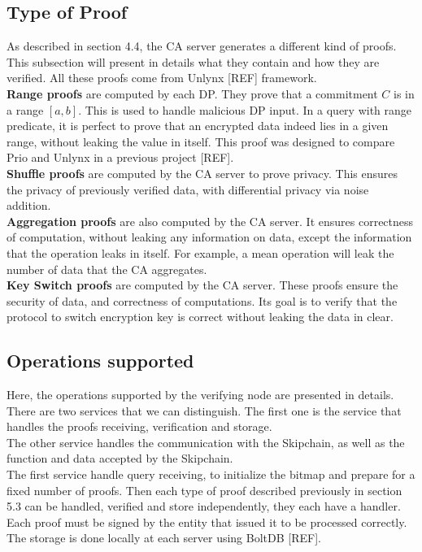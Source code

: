 \documentclass{article}
\begin{document}
\subsection{Type of Proof}
As described in section 4.4, the CA server generates a different kind of proofs. This subsection will present in details what they contain and how they are verified. All these proofs come from Unlynx [REF] framework.\\
\textbf{Range proofs} are computed by each DP. They prove that a commitment $C$ is in a range $[a,b]$. This is used to handle malicious DP input. In a query with range predicate, it is perfect to prove that an encrypted data indeed lies in a given range, without leaking the value in itself. This proof was designed to compare Prio and Unlynx in a previous project [REF].\\
\textbf{Shuffle proofs} are computed by the CA server to prove privacy. This ensures the privacy of previously verified data, with differential privacy via noise addition.\\
\textbf{Aggregation proofs} are also computed by the CA server. It ensures correctness of computation, without leaking any information on data, except the information that the operation leaks in itself. For example, a mean operation will leak the number of data that the CA aggregates.\\
\textbf{Key Switch proofs} are computed by the CA server. These proofs ensure the security of data, and correctness of computations. Its goal is to verify that the protocol to switch encryption key is correct without leaking the data in clear.\\

\subsection{Operations supported}
Here, the operations supported by the verifying node are presented in details.\\
There are two services that we can distinguish. The first one is the service that handles the proofs receiving, verification and storage.\\
The other service handles the communication with the Skipchain, as well as the function and data accepted by the Skipchain. \\ 

The first service handle query receiving, to initialize the bitmap and prepare for a fixed number of proofs. Then each type of proof described previously in section 5.3 can be handled, verified and store independently, they each have a handler. Each proof must be signed by the entity that issued it to be processed correctly. The storage is done locally at each server using BoltDB [REF].\\
\end{document}
